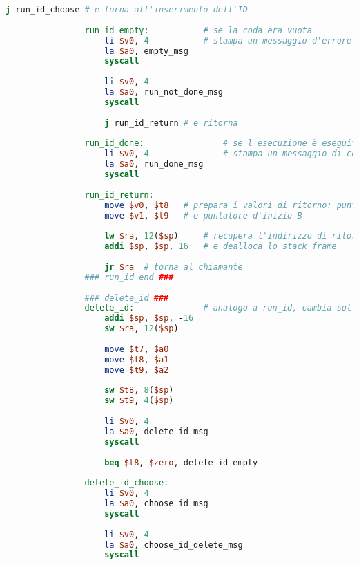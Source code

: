 \begin{center}
\begin{lstlisting}[language=mips, gobble=14, stepnumber=1]
                    j run_id_choose # e torna all'inserimento dell'ID
                    
                run_id_empty:           # se la coda era vuota
                    li $v0, 4           # stampa un messaggio d'errore
                    la $a0, empty_msg
                    syscall
                    
                    li $v0, 4
                    la $a0, run_not_done_msg
                    syscall
                    
                    j run_id_return # e ritorna
                    
                run_id_done:                # se l'esecuzione è eseguita con successo
                    li $v0, 4               # stampa un messaggio di corretta terminazione
                    la $a0, run_done_msg
                    syscall
                
                run_id_return:
                    move $v0, $t8   # prepara i valori di ritorno: puntatore d'inizio A
                    move $v1, $t9   # e puntatore d'inizio B
                    
                    lw $ra, 12($sp)     # recupera l'indirizzo di ritorno dallo stack
                    addi $sp, $sp, 16   # e dealloca lo stack frame
                    
                    jr $ra  # torna al chiamante
                ### run_id end ###
                
                ### delete_id ###
                delete_id:              # analogo a run_id, cambia soltanto la parte centrale
                    addi $sp, $sp, -16
                    sw $ra, 12($sp)
                
                    move $t7, $a0
                    move $t8, $a1
                    move $t9, $a2
                    
                    sw $t8, 8($sp)
                    sw $t9, 4($sp)
                
                    li $v0, 4
                    la $a0, delete_id_msg
                    syscall
                    
                    beq $t8, $zero, delete_id_empty
                    
                delete_id_choose:
                    li $v0, 4
                    la $a0, choose_id_msg
                    syscall
                    
                    li $v0, 4
                    la $a0, choose_id_delete_msg
                    syscall
                    

\end{lstlisting}
\end{center}
